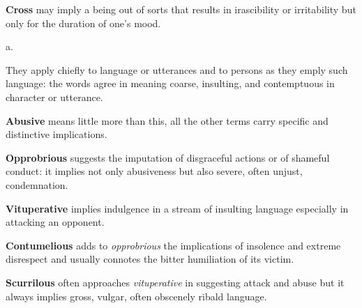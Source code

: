 \begin{description}[style=unboxed]
\begin{mynewitemize}
\item \textbf{Cross} may imply a being out of sorts that results in irascibility
or irritability but only for the duration of one's mood.

\end{mynewitemize}

 a.
\begin{mynewitemize}
\item They apply chiefly to language or utterances and to persons as they
emply such language: the words agree in meaning coarse, insulting, and contemptuous 
in character or utterance.
\item \textbf{Abusive} means little more than this, all the other terms carry
specific and distinctive implications.
\item \textbf{Opprobrious} suggests the imputation of disgraceful actions or
of shameful conduct: it implies not only abusiveness but also severe, often
unjust, condemnation.
\item \textbf{Vituperative} implies indulgence in a stream of insulting language
especially in attacking an opponent.
\item \textbf{Contumelious} adds to \textit{opprobrious} the implications of
insolence and extreme disrespect and usually connotes the bitter humiliation
of its victim.
\item \textbf{Scurrilous} often approaches \textit{vituperative} in suggesting
attack and abuse but it always implies gross, vulgar, often obscenely ribald 
language.
\end{mynewitemize}


\end{description}
